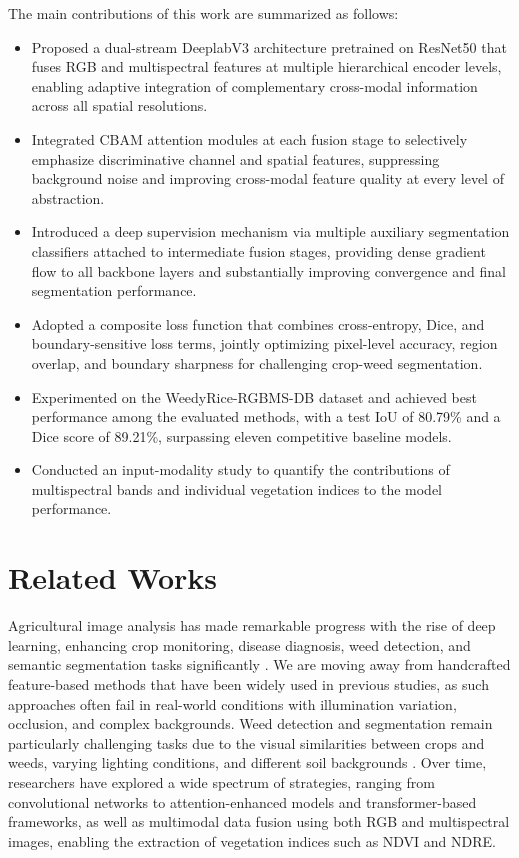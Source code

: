 \documentclass[pdflatex,sn-mathphys-num]{sn-jnl}
\begin{document}
The main contributions of this work are summarized as follows:
\begin{itemize}
\item Proposed a dual-stream DeeplabV3 architecture pretrained on ResNet50 that fuses RGB and multispectral features at multiple hierarchical encoder levels, enabling adaptive integration of complementary cross-modal information across all spatial resolutions.
\item Integrated CBAM attention modules at each fusion stage to selectively emphasize discriminative channel and spatial features, suppressing background noise and improving cross-modal feature quality at every level of abstraction.
\item Introduced a deep supervision mechanism via multiple auxiliary segmentation classifiers attached to intermediate fusion stages, providing dense gradient flow to all backbone layers and substantially improving convergence and final segmentation performance. 
\item Adopted a composite loss function that combines cross-entropy, Dice, and boundary-sensitive loss terms, jointly optimizing pixel-level accuracy, region overlap, and boundary sharpness for challenging crop-weed segmentation.
\item Experimented on the WeedyRice-RGBMS-DB dataset and achieved best performance among the evaluated methods, with a test IoU of 80.79\% and a Dice score of 89.21\%, surpassing eleven competitive baseline models.
\item Conducted an input-modality study to quantify the contributions of multispectral bands and individual vegetation indices to the model performance.

\end{itemize}
\section{Related Works}
Agricultural image analysis has made remarkable progress with the rise of deep learning, enhancing crop monitoring, disease diagnosis, weed detection, and semantic segmentation tasks significantly \cite{lei2024segmentationreview}. We are moving away from handcrafted feature-based methods that have been widely used in previous studies, as such approaches often fail in real-world conditions with illumination variation, occlusion, and complex backgrounds. Weed detection and segmentation remain particularly challenging tasks due to the visual similarities between crops and weeds, varying lighting conditions, and different soil backgrounds \cite{zhao2025deep,saini2025review}. Over time, researchers have explored a wide spectrum of strategies, ranging from convolutional networks to attention-enhanced models and transformer-based frameworks, as well as multimodal data fusion using both RGB and multispectral images, enabling the extraction of vegetation indices such as NDVI and NDRE.
\end{document}
